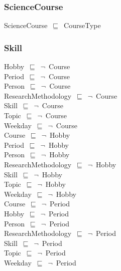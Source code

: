 \documentclass{article}
\begin{document}
\subsubsection*{ScienceCourse}

ScienceCourse~\ensuremath{\sqsubseteq}~CourseType~

\subsubsection*{Skill}

Hobby~\ensuremath{\sqsubseteq}~\ensuremath{\lnot}~Course\\
Period~\ensuremath{\sqsubseteq}~\ensuremath{\lnot}~Course\\
Person~\ensuremath{\sqsubseteq}~\ensuremath{\lnot}~Course\\
ResearchMethodology~\ensuremath{\sqsubseteq}~\ensuremath{\lnot}~Course\\
Skill~\ensuremath{\sqsubseteq}~\ensuremath{\lnot}~Course\\
Topic~\ensuremath{\sqsubseteq}~\ensuremath{\lnot}~Course\\
Weekday~\ensuremath{\sqsubseteq}~\ensuremath{\lnot}~Course\\
Course~\ensuremath{\sqsubseteq}~\ensuremath{\lnot}~Hobby\\
Period~\ensuremath{\sqsubseteq}~\ensuremath{\lnot}~Hobby\\
Person~\ensuremath{\sqsubseteq}~\ensuremath{\lnot}~Hobby\\
ResearchMethodology~\ensuremath{\sqsubseteq}~\ensuremath{\lnot}~Hobby\\
Skill~\ensuremath{\sqsubseteq}~\ensuremath{\lnot}~Hobby\\
Topic~\ensuremath{\sqsubseteq}~\ensuremath{\lnot}~Hobby\\
Weekday~\ensuremath{\sqsubseteq}~\ensuremath{\lnot}~Hobby\\
Course~\ensuremath{\sqsubseteq}~\ensuremath{\lnot}~Period\\
Hobby~\ensuremath{\sqsubseteq}~\ensuremath{\lnot}~Period\\
Person~\ensuremath{\sqsubseteq}~\ensuremath{\lnot}~Period\\
ResearchMethodology~\ensuremath{\sqsubseteq}~\ensuremath{\lnot}~Period\\
Skill~\ensuremath{\sqsubseteq}~\ensuremath{\lnot}~Period\\
Topic~\ensuremath{\sqsubseteq}~\ensuremath{\lnot}~Period\\
Weekday~\ensuremath{\sqsubseteq}~\ensuremath{\lnot}~Period\\
\end{document}
